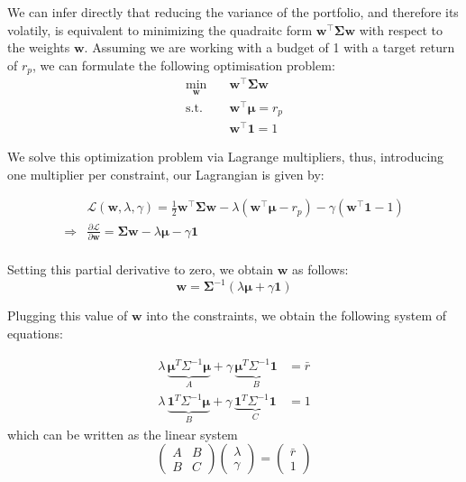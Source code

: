 \documentclass{article}
\newcommand{\bmu}{\boldsymbol{\mu}}
\newcommand{\bw}{\mathbf{w}}
\newcommand{\bSigma}{\boldsymbol{\Sigma}}
\newcommand{\bone}{\mathbf{1}}
\begin{document}
We can infer directly that reducing the variance of the portfolio, and therefore its volatily, is equivalent to minimizing the quadraitc form $\bw^\top \bSigma \bw$ with respect to the weights $\bw$.
Assuming we are working with a budget of 1 with a target return of $r_p$, we can formulate the following optimisation problem:
\begin{equation}
    \begin{aligned}
        \min_{\bw} \quad & \bw^\top \bSigma \bw \\
        \text{s.t.} \quad & \bw^\top \bmu = r_p \\
        & \bw^\top \bone = 1
    \end{aligned}
\end{equation}

We solve this optimization problem via Lagrange multipliers, thus, introducing one multiplier per constraint, our Lagrangian is given by:

\begin{equation}
    \begin{aligned}
        &\mathcal{L}(\bw, \lambda, \gamma) = \frac{1}{2} \bw^\top \bSigma \bw - \lambda (\bw^\top \bmu - r_p) - \gamma (\bw^\top \bone - 1)\\
        \Rightarrow & \frac{\partial \mathcal{L}}{\partial \bw} = \bSigma \bw - \lambda \bmu - \gamma \bone \\
    \end{aligned}
\end{equation}

Setting this partial derivative to zero, we obtain $\bw$ as follows:
\begin{equation}
    \bw =\bSigma^{-1} (\lambda \bmu + \gamma \bone)
\end{equation}

Plugging this value of $\bw$ into the constraints, we obtain the following system of equations:

\begin{align}
    \lambda\,\underbrace{\boldsymbol{\mu}^T\Sigma^{-1}\boldsymbol{\mu}}_{A} + \gamma\,\underbrace{\boldsymbol{\mu}^T\Sigma^{-1}\mathbf{1}}_{B} &= \bar r \\
    \lambda\,\underbrace{\mathbf{1}^T\Sigma^{-1}\boldsymbol{\mu}}_{B} + \gamma\,\underbrace{\mathbf{1}^T\Sigma^{-1}\mathbf{1}}_{C} &= 1
\end{align}
which can be written as the linear system
\begin{equation}
    \begin{pmatrix} A & B \\ B & C \end{pmatrix}
    \begin{pmatrix} \lambda \\ \gamma \end{pmatrix}
    =
    \begin{pmatrix} \bar r \\ 1 \end{pmatrix}
\end{equation}
\end{document}
